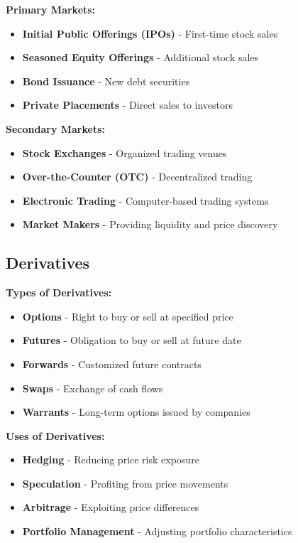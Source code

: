 \documentclass[12pt]{article}
\begin{document}
\textbf{Primary Markets:}
\begin{itemize}
    \item \textbf{Initial Public Offerings (IPOs)} - First-time stock sales
    \item \textbf{Seasoned Equity Offerings} - Additional stock sales
    \item \textbf{Bond Issuance} - New debt securities
    \item \textbf{Private Placements} - Direct sales to investors
\end{itemize}

\textbf{Secondary Markets:}
\begin{itemize}
    \item \textbf{Stock Exchanges} - Organized trading venues
    \item \textbf{Over-the-Counter (OTC)} - Decentralized trading
    \item \textbf{Electronic Trading} - Computer-based trading systems
    \item \textbf{Market Makers} - Providing liquidity and price discovery
\end{itemize}

\subsection{Derivatives}

\textbf{Types of Derivatives:}
\begin{itemize}
    \item \textbf{Options} - Right to buy or sell at specified price
    \item \textbf{Futures} - Obligation to buy or sell at future date
    \item \textbf{Forwards} - Customized future contracts
    \item \textbf{Swaps} - Exchange of cash flows
    \item \textbf{Warrants} - Long-term options issued by companies
\end{itemize}

\textbf{Uses of Derivatives:}
\begin{itemize}
    \item \textbf{Hedging} - Reducing price risk exposure
    \item \textbf{Speculation} - Profiting from price movements
    \item \textbf{Arbitrage} - Exploiting price differences
    \item \textbf{Portfolio Management} - Adjusting portfolio characteristics
\end{itemize}
\end{document}
